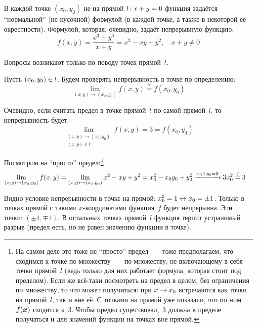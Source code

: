 \documentclass[a4paper,12pt]{article}
\begin{document}
  \begin{solution}
    В каждой точке $(x_0, y_0)$ не на прямой $l\colon x \hm+ y \hm= 0$ функция задаётся ``нормальной'' (не кусочной) формулой (в каждой точке, а также в некоторой её окрестности).
    Формулой, которая, очевидно, задаёт непрерывную функцию:
    \[
      f(x, y) = \frac{x^3 + y^3}{x + y} = x^2 - xy + y^2,\quad x + y \not= 0
    \]

    Вопросы возникают только по поводу точек прямой~$l$.

    Пусть $(x_0, y_0) \hm\in l$.
    Будем проверять непрерывность в точке по определению:
    \[
      \lim_{(x, y) \to (x_0, y_0)} f(x, y) \overset{?}{=} f(x_0, y_0)
    \]

    Очевидно, если считать предел в точке прямой~$l$ по самой прямой~$l$, то непрерывность будет:
    \[
      \lim_{\substack{(x, y) \to (x_0, y_0) \\ (x, y) \in l}} f(x, y) = 3 = f(x_0, y_0)
    \]

    Посмотрим на ``просто'' предел:\footnote{
      На самом деле это тоже не ``просто'' предел~---~тоже предполагаем, что сходимся к точке по множеству~---~по множеству, не включающему в себя точки прямой~$l$ (ведь только для них работает формула, которая стоит под пределом).
      Если же всё-таки посмотреть на предел в целом, без ограничения по множеству, то что может получиться: при $x \hm\to x_0$ встречаются как точки на прямой~$l$, так и вне её.
      С точками на прямой уже показали, что по ним~$f(\boldsymbol x)$ сходится к~$3$.
      Чтобы предел существовал,~$3$ должна в пределе получаться и для значений функции на точках вне прямой.
    }
    \begin{equation*}
    \begin{split}
      \lim_{(x, y) \to (x_0, y_0)} f(x, y) &= \lim_{(x, y) \to (x_0, y_0)} x^2 - xy + y^2
      = x_0^2 - x_0 y_0 + y_0^2 \xrightarrow{x_0 + y_0 = 0} 3 x_0^2 \overset{\operatorname{?}}{=} 3
    \end{split}
    \end{equation*}

    Видно условие непрерывности в точке на прямой: $x_0^2 \hm= 1 \hm\leftrightarrow x_0 \hm= \pm 1$.
    Только в точках прямой с такими $x$-координатами функция~$f$ будет непрерывна.
    Эти точки: $(\pm 1, \mp 1)$.
    В остальных точках прямой~$l$ функция терпит устранимый разрыв (предел есть, но не равен значению функции в точке).
  \end{solution}
\end{document}
